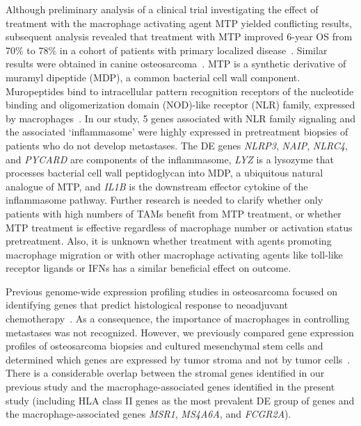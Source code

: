 Although preliminary analysis of a clinical trial investigating
the effect of treatment with the macrophage
activating agent MTP yielded conflicting results, subsequent
analysis revealed that treatment with MTP
improved 6-year OS from 70\% to 78\% in a cohort of
patients with primary localized disease~\cite{meyers2008osteosarcoma,meyers2005osteosarcoma}. Similar
results were obtained in canine osteosarcoma~\cite{kurzman1995adjuvant}. MTP
is a synthetic derivative of muramyl dipeptide (MDP), a
common bacterial cell wall component. Muropeptides
bind to intracellular pattern recognition receptors of
the nucleotide binding and oligomerization domain
(NOD)-like receptor (NLR) family, expressed
by macrophages~\cite{geddes2009unleashing}. In our study, 5 genes associated
with NLR family signaling and the associated `inflammasome'
were highly expressed in pretreatment biopsies of
patients who do not develop metastases. The DE genes
{\it NLRP3}, {\it NAIP}, {\it NLRC4}, and {\it PYCARD} are components of
the inflammasome, {\it LYZ} is a lysozyme that processes
bacterial cell wall peptidoglycan into MDP, a ubiquitous
natural analogue of MTP, and {\it IL1B} is the downstream
effector cytokine of the inflammasome pathway. Further
research is needed to clarify whether only patients with
high numbers of TAMs benefit from MTP treatment, or
whether MTP treatment is effective regardless of macrophage
number or activation status pretreatment. Also, it is
unknown whether treatment with agents promoting
macrophage migration or with other macrophage activating
agents like toll\hyp{}like receptor ligands or IFNs has a
similar beneficial effect on outcome.

Previous genome\hyp{}wide expression profiling studies in
osteosarcoma focused on identifying genes that predict
histological response to neoadjuvant chemotherapy~\cite{ochi2004prediction,salas2009molecular,man2005expression,mintz2005expression}.
As a consequence, the importance of macrophages in
controlling metastases was not recognized. However, we
previously compared gene expression profiles of osteosarcoma
biopsies and cultured mesenchymal stem cells
and determined which genes are expressed by tumor
stroma and not by tumor cells~\cite{cleton2009profiling}. There is a considerable
overlap between the stromal genes identified in
our previous study and the macrophage\hyp{}associated
genes identified in the present study (including HLA
class II genes as the most prevalent DE group of genes
and the macrophage\hyp{}associated genes {\it MSR1}, {\it MS4A6A},
and {\it FCGR2A}).

